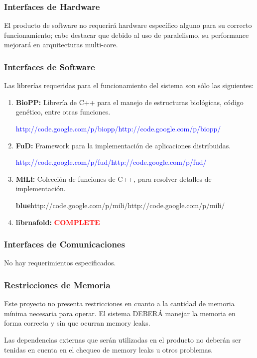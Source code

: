 \documentclass[12pt,a4paper,english,spanish]{article}
\begin{document}
	\subsubsection{Interfaces de Hardware}
		El producto de software no requerirá hardware específico alguno para su correcto funcionamiento; cabe destacar 	que debido al uso de paralelismo, 			su performance mejorará en arquitecturas multi-core.

	\subsubsection{Interfaces de Software}
		Las librerías requeridas para el funcionamiento del sistema son sólo las siguientes:
		\begin{enumerate}
			\item \textbf{BioPP:} Librería de C++ para el manejo de estructuras biológicas, código
						genético, entre otras funciones. 
						\par \noindent \textcolor{blue}{http://code.google.com/p/biopp/http://code.google.com/p/biopp/}

			\item \textbf{FuD:} Framework para la implementación de aplicaciones distribuidas. 
						\par \noindent \textcolor{blue}{http://code.google.com/p/fud/http://code.google.com/p/fud/}

			\item \textbf{MiLi:} Colección de funciones de C++, para resolver detalles de implementación.
						\par \noindent \textbf{blue}{http://code.google.com/p/mili/http://code.google.com/p/mili/}

			\item \textbf{librnafold:} \textbf{\textcolor{red}{COMPLETE}}
		\end{enumerate}

	\subsubsection{Interfaces de Comunicaciones}
		No hay requerimientos especificados.

	\subsubsection{Restricciones de Memoria}	
		\par Este proyecto no presenta restricciones en cuanto a la cantidad de memoria mínima necesaria para operar. El sistema DEBERÁ manejar la memoria 			en forma correcta y sin que ocurran memory leaks.
		\par Las dependencias externas que serán utilizadas en el producto no deberán ser tenidas en cuenta en el chequeo 
		de memory leaks u otros problemas.
		
\end{document}
